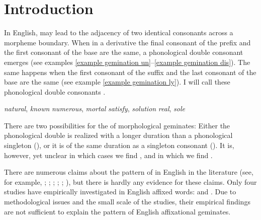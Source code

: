 \chapter{Introduction} \label{Introduction}



In English,  may lead to the adjacency of two identical consonants across a morpheme boundary. When in a derivative the final consonant of the prefix and the first consonant of the base are the same, a phonological double consonant emerges (see examples \ref{example gemination un}--\ref{example gemination dis}). The same happens when the first consonant of the suffix and the last consonant of the base are the same (see example \ref{example gemination ly}). I will call these phonological double consonants  .


\begin{exe} 
	\ex \label{example gemination un}    \textit{natural}, \textit{known}
	\ex \label{example gemination in}    \textit{numerous}, \textit{mortal}
	\ex \label{example gemination dis}  \textit{satisfy}, \textit{solution}
	\ex \label{example gemination ly}    \textit{real}, \textit{sole}
\end{exe}

 There are two possibilities for the  of  morphological geminates: Either the phonological double is realized with a longer duration than a phonological singleton (), or it is of the same duration as a singleton consonant (). It is, however, yet unclear in which cases we find , and in which we find .
 
There are numerous claims about the pattern of  in English  in the literature (see, for example, \citealt[141]{Wijk.1966}; \citealt[255]{OConnor.1973}; \citealt[18]{Mohanan.1986}; \citealt[251]{Ladefoged.1993}; \citealt{Roach.2011,Wells.2008}; \citealt[1055f.]{CohenGoldberg.2013}), but there is hardly any evidence for these claims. %
Only four studies have empirically investigated  in English affixed words: \cite{Kaye.2005,Oh.2012,Oh.2013} and \cite{Kotzor.2016}. Due to methodological issues and the small scale of the studies, their empirical findings are not sufficient to explain the  pattern of English affixational geminates.



